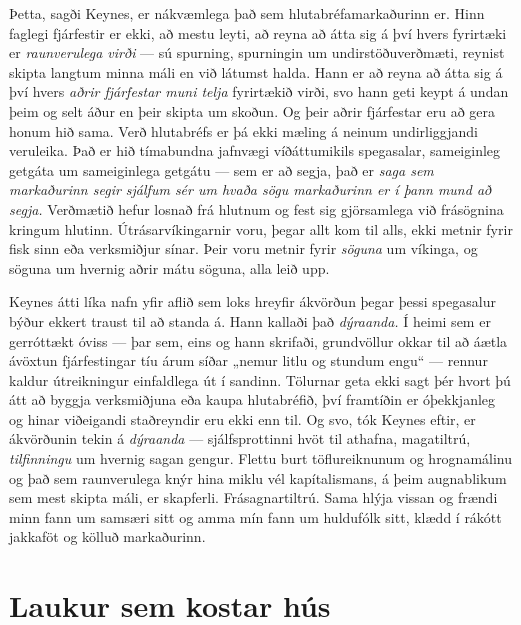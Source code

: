 Þetta, sagði Keynes, er nákvæmlega það sem hlutabréfamarkaðurinn er. Hinn faglegi fjárfestir er ekki, að mestu leyti, að reyna að átta sig á því hvers fyrirtæki er \emph{raunverulega virði} — sú spurning, spurningin um undirstöðuverðmæti, reynist skipta langtum minna máli en við látumst halda. Hann er að reyna að átta sig á því hvers \emph{aðrir fjárfestar muni telja} fyrirtækið virði, svo hann geti keypt á undan þeim og selt áður en þeir skipta um skoðun. Og þeir aðrir fjárfestar eru að gera honum hið sama. Verð hlutabréfs er þá ekki mæling á neinum undirliggjandi veruleika. Það er hið tímabundna jafnvægi víðáttumikils spegasalar, sameiginleg getgáta um sameiginlega getgátu — sem er að segja, það er \emph{saga sem markaðurinn segir sjálfum sér um hvaða sögu markaðurinn er í þann mund að segja.} Verðmætið hefur losnað frá hlutnum og fest sig gjörsamlega við frásögnina kringum hlutinn. Útrásarvíkingarnir voru, þegar allt kom til alls, ekki metnir fyrir fisk sinn eða verksmiðjur sínar. Þeir voru metnir fyrir \emph{söguna} um víkinga, og söguna um hvernig aðrir mátu söguna, alla leið upp.

Keynes átti líka nafn yfir aflið sem loks hreyfir ákvörðun þegar þessi spegasalur býður ekkert traust til að standa á. Hann kallaði það \emph{dýraanda.} Í heimi sem er gerróttækt óviss — þar sem, eins og hann skrifaði, grundvöllur okkar til að áætla ávöxtun fjárfestingar tíu árum síðar „nemur litlu og stundum engu“ — rennur kaldur útreikningur einfaldlega út í sandinn. Tölurnar geta ekki sagt þér hvort þú átt að byggja verksmiðjuna eða kaupa hlutabréfið, því framtíðin er óþekkjanleg og hinar viðeigandi staðreyndir eru ekki enn til. Og svo, tók Keynes eftir, er ákvörðunin tekin á \emph{dýraanda} — sjálfsprottinni hvöt til athafna, magatiltrú, \emph{tilfinningu} um hvernig sagan gengur. Flettu burt töflureiknunum og hrognamálinu og það sem raunverulega knýr hina miklu vél kapítalismans, á þeim augnablikum sem mest skipta máli, er skapferli. Frásagnartiltrú. Sama hlýja vissan og frændi minn fann um samsæri sitt og amma mín fann um huldufólk sitt, klædd í rákótt jakkaföt og kölluð markaðurinn.

\section*{Laukur sem kostar hús}

